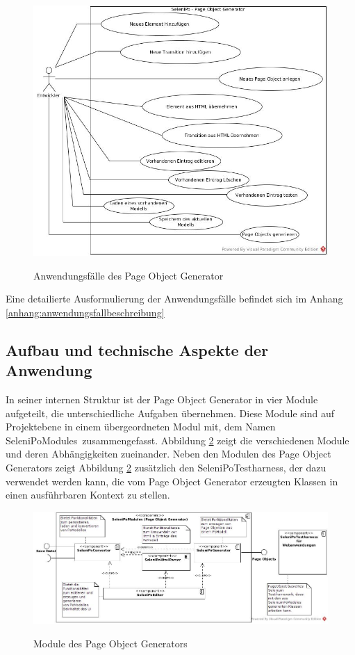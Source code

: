 \begin{figure}[htb]
  \centering  
  \includegraphics[scale=0.45]{img/Use-Cases.jpg}\\
  \caption{Anwendungsfälle des Page Object Generator}
  \label{fig:use_case}
\end{figure}

Eine detailierte Ausformulierung der Anwendungsfälle befindet sich im Anhang \ref{anhang:anwendungsfallbeschreibung}

\newpage

\subsection{Aufbau und technische Aspekte der Anwendung}
\label{sec:aufbau_des_systems}
In seiner internen Struktur ist der Page Object Generator in vier Module aufgeteilt, die unterschiedliche Aufgaben übernehmen. Diese Module sind auf Projektebene in einem übergeordneten Modul mit, dem Namen \grq SeleniPoModules\grq\ zusammengefasst. Abbildung \ref{fig:component_diagramm} zeigt die verschiedenen Module und deren Abhängigkeiten zueinander.
Neben den Modulen des Page Object Generators zeigt Abbildung \ref{fig:component_diagramm} zusätzlich den SeleniPoTestharness, der dazu verwendet werden kann, die vom Page Object Generator erzeugten Klassen in einen ausführbaren Kontext zu stellen.

\begin{figure}[htb]
  \centering  
  \includegraphics[scale=0.46]{img/ComponentDiagram.jpg}\\
  \caption{Module des Page Object Generators}
  \label{fig:component_diagramm}
\end{figure}

